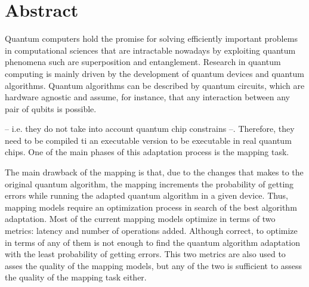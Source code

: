 \chapter*{Abstract}




Quantum computers hold the promise for solving efficiently important problems in computational sciences that are intractable nowadays by exploiting quantum phenomena such are superposition and entanglement. 
 Research in quantum computing is mainly driven by the development of quantum devices and quantum algorithms. Quantum algorithms can be described by quantum circuits, which are hardware agnostic and assume, for instance, that any interaction between any pair of qubits is possible.
 
 
 -- i.e. they do not take into account quantum chip constrains --.  Therefore, they need to be compiled ti an executable version  to be executable in real quantum chips.
One of the main phases of this adaptation process is the mapping task.

The main drawback of the mapping is that, due to the changes that makes to the original quantum algorithm, the mapping increments the probability of getting errors while running the adapted quantum algorithm in a given device.
Thus, mapping models require an optimization process in search of the best algorithm adaptation.
Most of the current mapping models optimize in terms of two metrics: latency and number of operations added.
Although correct, to optimize in terms of any of them is not enough to find the quantum algorithm adaptation with the least probability of getting errors.
This two metrics are also used to asses the quality of the mapping models, but any of the two is sufficient to assess the quality of the mapping task either.

